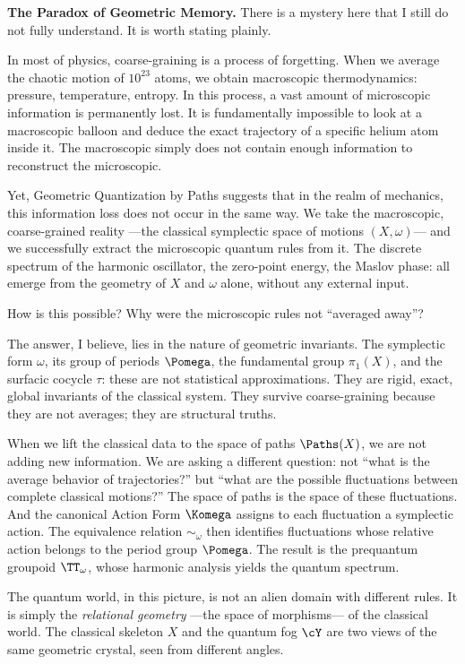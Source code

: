 \smallskip
\textbf{The Paradox of Geometric Memory.}
There is a mystery here that I still do not fully understand.
It is worth stating plainly.

In most of physics,
coarse-graining is a process of forgetting.
When we average the chaotic motion of $10^{23}$ atoms,
we obtain macroscopic thermodynamics:
pressure, temperature, entropy.
In this process,
a vast amount of microscopic information is permanently lost.
It is fundamentally impossible to look at a macroscopic balloon
and deduce the exact trajectory of a specific helium atom inside it.
The macroscopic simply does not contain enough information
to reconstruct the microscopic.

Yet,
Geometric Quantization by Paths suggests
that in the realm of mechanics,
this information loss does not occur in the same way.
We take the macroscopic, coarse-grained reality
---the classical symplectic space of motions $(X,\omega)$---
and we successfully extract the microscopic quantum rules from it.
The discrete spectrum of the harmonic oscillator,
the zero-point energy,
the Maslov phase:
all emerge from the geometry of $X$ and $\omega$ alone,
without any external input.

How is this possible?
Why were the microscopic rules not ``averaged away''?

The answer,
I believe,
lies in the nature of geometric invariants.
The symplectic form $\omega$,
its group of periods $\Pomega$,
the fundamental group $\pi_1(X)$,
and the surfacic cocycle $\tau$:
these are not statistical approximations.
They are rigid,
exact,
global invariants of the classical system.
They survive coarse-graining because they are not averages;
they are structural truths.

When we lift the classical data to the space of paths $\Paths(X)$,
we are not adding new information.
We are asking a different question:
not ``what is the average behavior of trajectories?''
but ``what are the possible fluctuations between complete classical motions?''
The space of paths is the space of these fluctuations.
And the canonical Action Form $\Komega$ assigns to each fluctuation
a symplectic action.
The equivalence relation $\sim_\omega$ then identifies fluctuations
whose relative action belongs to the period group $\Pomega$.
The result is the prequantum groupoid $\TT_\omega$,
whose harmonic analysis yields the quantum spectrum.

The quantum world,
in this picture,
is not an alien domain with different rules.
It is simply the \emph{relational geometry}
---the space of morphisms---
of the classical world.
The classical skeleton $X$ and the quantum fog $\cY$
are two views of the same geometric crystal,
seen from different angles.

